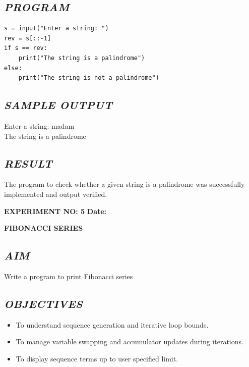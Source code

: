 \documentclass[11pt,a4paper]{article}
\begin{document}
\subsection*{\textit{PROGRAM}}
\begin{lstlisting}[style=pythonstyle]
s = input("Enter a string: ")
rev = s[::-1]
if s == rev:
    print("The string is a palindrome")
else:
    print("The string is not a palindrome")
\end{lstlisting}

\subsection*{\textit{SAMPLE OUTPUT}}
\begin{tcolorbox}[colback=black!85,colframe=navyblue,title=\textbf{Terminal Output},coltitle=white,fonttitle=\bfseries\small]
\small\ttfamily\color{green!30!white}
Enter a string: madam\\
The string is a palindrome
\end{tcolorbox}

\subsection*{\textit{RESULT}}
The program to check whether a given string is a palindrome was successfully implemented and output verified.

\newpage

\noindent
\textbf{\large EXPERIMENT NO: 5} \hfill \textbf{\large Date: \underline{\hspace{3cm}}}

\vspace{0.2cm}
\begin{center}
{\Huge \textbf{\textcolor{navyblue}{FIBONACCI SERIES}}}
\end{center}
\vspace{0.3cm}

\subsection*{\textit{AIM}}
Write a program to print Fibonacci series

\subsection*{\textit{OBJECTIVES}}
\begin{itemize}
  \item To understand sequence generation and iterative loop bounds.
  \item To manage variable swapping and accumulator updates during iterations.
  \item To display sequence terms up to user specified limit.
\end{itemize}
\end{document}
